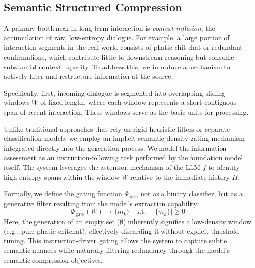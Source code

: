 \documentclass{article}
\theoremstyle{plain}
\theoremstyle{definition}
\theoremstyle{remark}
\begin{document}
\subsection{Semantic Structured Compression}
\label{sec:atomization}
A primary bottleneck in long-term interaction is \emph{context inflation}, the accumulation of raw, low-entropy dialogue. For example, a large portion of interaction segments in the real-world consists of phatic chit-chat or redundant confirmations, which contribute little to downstream reasoning but consume substantial context capacity. To address this, we introduce a mechanism to actively filter and restructure information at the source.

Specifically, first, incoming dialogue is segmented into overlapping sliding windows \(W\) of fixed length, where each window represents a short contiguous span of recent interaction. These windows serve as the basic units for processing.

Unlike traditional approaches that rely on rigid heuristic filters or separate classification models, we employ an implicit semantic density gating mechanism integrated directly into the generation process. We model the information assessment as an instruction-following task performed by the foundation model itself. The system leverages the attention mechanism of the LLM $f$ to identify high-entropy spans within the window $W$ relative to the immediate history $H$.

Formally, we define the gating function $\Phi_{\text{gate}}$ not as a binary classifier, but as a generative filter resulting from the model's extraction capability:
\begin{equation}
    \Phi_{\text{gate}}(W) \to \{m_k\} \quad \text{s.t.} \quad |\{m_k\}| \ge 0
\end{equation}
Here, the generation of an empty set ($\emptyset$) inherently signifies a low-density window (e.g., pure phatic chitchat), effectively discarding it without explicit threshold tuning. This instruction-driven gating allows the system to capture subtle semantic nuances while naturally filtering redundancy through the model's semantic compression objectives.
\end{document}
